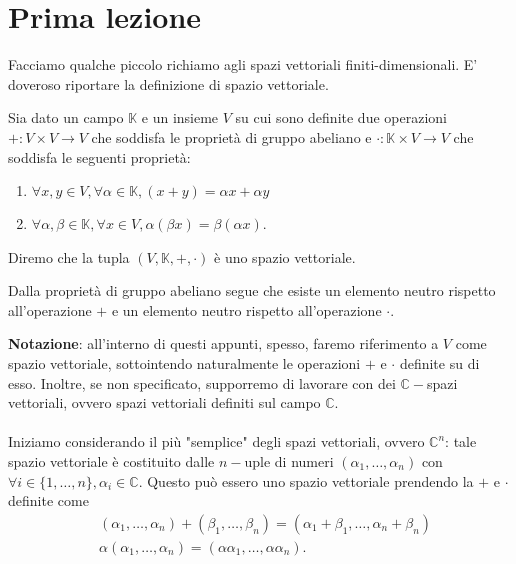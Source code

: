 \documentclass[12pt, twoside, italian, openany]{book}
\begin{document}
	\chapter{Prima lezione}
	\pagestyle{plain}
	\thispagestyle{empty}

	\pagestyle{fancy}
	Facciamo qualche piccolo richiamo agli spazi vettoriali finiti-dimensionali. E' doveroso riportare la definizione di spazio vettoriale.
	\begin{definition}
		Sia dato un campo $\mathbb{K}$ e un insieme $V$ su cui sono definite due operazioni $+: V \times V \to V$ che soddisfa le proprietà di gruppo abeliano e $\cdot: \mathbb{K} \times V \to V$ che soddisfa le seguenti proprietà:
		\begin{enumerate}[label=\protect\circled{\arabic*}]
			\item $\forall x, y \in V, \forall \alpha \in \mathbb{K}, (x + y) = \alpha x + \alpha y$
			\item $\forall \alpha, \beta \in \mathbb{K}, \forall x \in V, \alpha (\beta x) = \beta (\alpha x)$.
		\end{enumerate}
		Diremo che la tupla $(V, \mathbb{K}, +, \cdot)$ è uno spazio vettoriale.
	\end{definition}
	\begin{remark}
		Dalla proprietà di gruppo abeliano segue che esiste un elemento neutro rispetto all'operazione $+$ e un elemento neutro rispetto all'operazione $\cdot$.
	\end{remark}
	\textbf{Notazione}: all'interno di questi appunti, spesso, faremo riferimento a $V$ come spazio vettoriale, sottointendo naturalmente le operazioni $+$ e $\cdot$ definite su di esso. Inoltre, se non specificato, supporremo di lavorare con dei $\mathbb{C}-$spazi vettoriali, ovvero spazi vettoriali definiti sul campo $\mathbb{C}$. \\ \\
	Iniziamo considerando il più "semplice" degli spazi vettoriali, ovvero $\mathbb{C}^n$: tale spazio vettoriale è costituito dalle $n-$uple di numeri $(\alpha_1, \ldots, \alpha_n)$ con $\forall i \in \{1, \ldots, n \}, \alpha_i \in \mathbb{C}$. Questo può essero uno spazio vettoriale prendendo la $+$ e $\cdot$ definite come
	\begin{align*}
	&(\alpha_1, \ldots, \alpha_n) + (\beta_1, \ldots, \beta_n) = (\alpha_1 + \beta_1, \ldots, \alpha_n + \beta_n) \\
	&\alpha (\alpha_1, \ldots, \alpha_n) = (\alpha \alpha_1, \ldots, \alpha \alpha_n).
	\end{align*}
\end{document}
